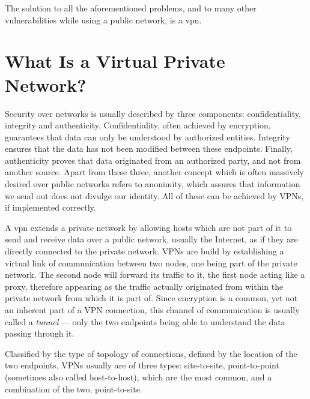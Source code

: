 \documentclass[a4paper,12pt]{report}
\begin{document}
		The solution to all the aforementioned problems, and to many other vulnerabilities while using a public network, is a \acrfull{vpn}.
		
		\section{What Is a Virtual Private Network?}
		Security over networks is usually described by three components: confidentiality, integrity and authenticity. Confidentiality, often achieved by encryption, guarantees that data can only be understood by authorized entities. Integrity ensures that the data has not been modified between these endpoints. Finally, authenticity proves that data originated from an authorized party, and not from another source. Apart from these three, another concept which is often massively desired over public networks refers to anonimity, which assures that information we send out does not divulge our identity. All of these can be achieved by VPNs, if implemented correctly.
		
		A \acrfull{vpn} extends a private network by allowing hosts which are not part of it to send and receive data over a public network, usually the Internet, as if they are directly connected to the private network. VPNs are build by establishing a virtual link of communication between two nodes, one being part of the private network. The second node will forward its traffic to it, the first node acting like a proxy, therefore appearing as the traffic actually originated from within the private network from which it is part of. Since encryption is a common, yet not an inherent part of a VPN connection, this channel of communication is usually called a \textit{tunnel} --- only the two endpoints being able to understand the data passing through it. 
		
		Classified by the type of topology of connections, defined by the location of the two endpoints, VPNs usually are of three types: site-to-site, point-to-point (sometimes also called host-to-host), which are the most common, and a combination of the two, point-to-site.
		
\end{document}
